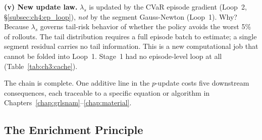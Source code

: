 \medskip
\noindent\textbf{(v) New update law.}
$\lambda_s$ is updated by the CVaR episode gradient (Loop~2,
§\ref{subsec:ch4:ep_loop}), \emph{not} by the segment
Gauss-Newton (Loop~1).
Why?
Because $\lambda_s$ governs tail-risk behavior of whether the policy
avoids the worst 5\% of rollouts.
The tail distribution requires a full episode batch to estimate;
a single segment residual carries no tail information.
This is a new computational job that cannot be folded into Loop~1.
Stage~1 had no episode-level loop at all (Table~\ref{tab:ch3:cache}).

\medskip
The chain is complete.
One additive line in the $p$-update costs five downstream consequences,
each traceable to a specific equation or algorithm in
Chapters~\ref{chap:grlsnam}--\ref{chap:material}.

\subsection{The Enrichment Principle}
\label{subsec:ch5:theorem}

